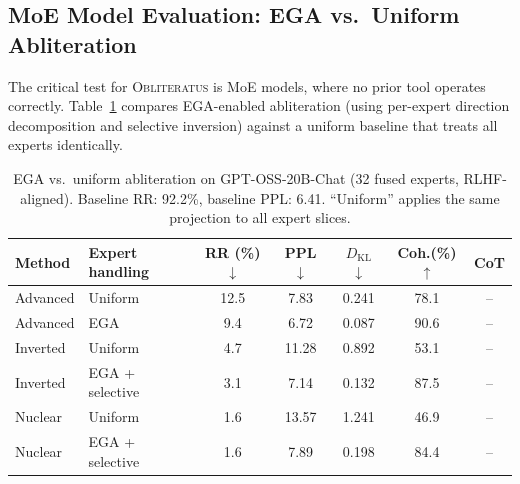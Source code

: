 \documentclass[11pt]{article}
\begin{document}
\subsection{MoE Model Evaluation: EGA vs.\ Uniform Abliteration}
\label{sec:exp_moe}

The critical test for \textsc{Obliteratus} is MoE models, where no prior tool operates correctly. Table~\ref{tab:exp_moe} compares EGA-enabled abliteration (using per-expert direction decomposition and selective inversion) against a uniform baseline that treats all experts identically.

\begin{table}[h]
\centering
\caption{EGA vs.\ uniform abliteration on GPT-OSS-20B-Chat (32 fused experts, RLHF-aligned). Baseline RR: 92.2\%, baseline PPL: 6.41. ``Uniform'' applies the same projection to all expert slices.}
\label{tab:exp_moe}
\small
\begin{tabular}{@{}llccccc@{}}
\toprule
\textbf{Method} & \textbf{Expert handling} & \textbf{RR (\%)} $\downarrow$ & \textbf{PPL} $\downarrow$ & \textbf{$D_{\text{KL}}$} $\downarrow$ & \textbf{Coh.(\%)} $\uparrow$ & \textbf{CoT} \\
\midrule
Advanced & Uniform & 12.5 & 7.83 & 0.241 & 78.1 & -- \\
Advanced & EGA & 9.4 & 6.72 & 0.087 & 90.6 & -- \\
\midrule
Inverted & Uniform & 4.7 & 11.28 & 0.892 & 53.1 & -- \\
Inverted & EGA + selective & 3.1 & 7.14 & 0.132 & 87.5 & -- \\
\midrule
Nuclear & Uniform & 1.6 & 13.57 & 1.241 & 46.9 & -- \\
Nuclear & EGA + selective & 1.6 & 7.89 & 0.198 & 84.4 & -- \\
\bottomrule
\end{tabular}
\end{table}
\end{document}
